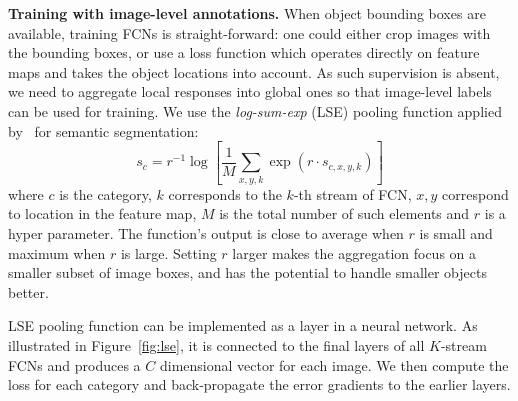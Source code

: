 \documentclass[10pt,twocolumn,letterpaper]{article}
\begin{document}




\textbf{Training with image-level annotations.} When object bounding boxes are available, training FCNs is straight-forward: one could either crop images with the bounding boxes, or use a loss function which operates directly on feature maps and takes the object locations into account. As such supervision is absent, we need to aggregate local responses into global ones so that image-level labels can be used for training. We use the \textit{log-sum-exp} (LSE) pooling function applied by~\cite{pinheiro:2015a} for semantic segmentation:
\begin{equation}
s_{c} = r^{-1}\log\left[\frac{1}{M}\sum_{x,y,k}\exp(r\cdot s_{c,x,y,k})\right]
\end{equation}
where $c$ is the category, $k$ corresponds to the $k$-th stream of FCN, $x,y$ correspond to location in the feature map, $M$ is the total number of such elements and $r$ is a hyper parameter. The function's output is close to average when $r$ is small and maximum when $r$ is large. Setting $r$ larger makes the aggregation focus on a smaller subset of image boxes, and has the potential to handle smaller objects better.

LSE pooling function can be implemented as a layer in a neural network. As illustrated in Figure~\ref{fig:lse}, it is connected to the final layers of all $K$-stream FCNs and produces a $C$ dimensional vector for each image. We then compute the loss for each category and back-propagate the error gradients to the earlier layers.
\end{document}
